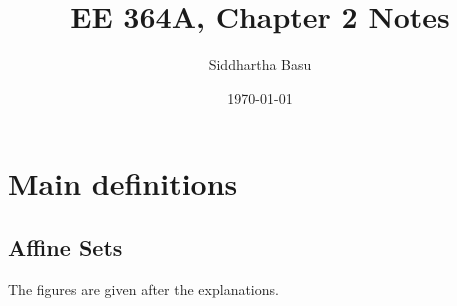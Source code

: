 \documentclass[12 pt, leqno]{article}
\begin{document}
\title{EE 364A, Chapter 2 Notes}
\author{Siddhartha Basu}
\date{\today}
\maketitle

\section*{Main definitions}

\subsection*{Affine Sets}

The figures are given after the explanations.
\end{document}
